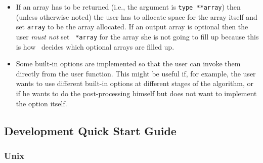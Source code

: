 \begin{description}
\begin{itemize}
\item If an array has to be returned (i.e., the argument is {\tt type
**array}) then (unless otherwise noted) the user has to allocate space
for the array itself and set {\tt *array} to be the array allocated.
If an output array is optional then the user {\em must not} set {\tt
*array} for the array she is not going to fill up because this is how
\BB\ decides which optional arrays are filled up.

\item Some built-in options are implemented so that the user can invoke them
directly from the user function. This might be useful if, for example,
the user wants to use different built-in options at different stages
of the algorithm, or if he wants to do the post-processing himself but
does not want to implement the option itself.
\end{itemize}

\end{description}

\subsection{Development Quick Start Guide}

\subsubsection{Unix}


